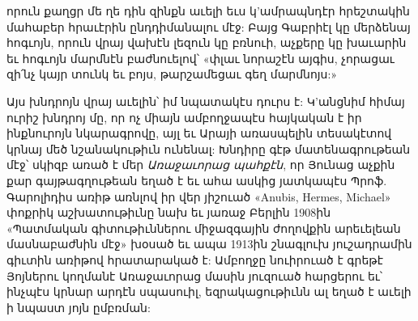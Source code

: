 \documentclass{article}
\begin{document}
{որուն քաղցր մե ղե դին զինքն աւելի եւս կ'ամրապնդէր հրեշտակին մահաբեր հրաւէրին ընդդիմանալու մէջ: Բայց Գաբրիէլ կը մերձենայ հոգւոյն, որուն վրայ վախէն լեզուն կը բռնուի, աչքերը կը խաւարին եւ հոգւոյն մարմնէն բաժնուելով՝ «փլաւ նորաշէն այգիս, չորացաւ զի՛նչ կայր տունկ եւ բոյս, թարշամեցաւ գեղ մարմնոյս:»

Այս խնդրոյն վրայ աւելին՝ իմ նպատակէս դուրս է: Կ'անցնիմ հիմայ ուրիշ խնդրոյ մը, որ ոչ միայն ամբողջապէս հայկական է իր ինքնուրոյն նկարագրովը, այլ եւ Արայի առասպելին տեսակէտով կրնայ մեծ նշանակութիւն ունենալ: Խնդիրը գէթ մատենագրութեան մէջ՝ սկիզբ առած է մեր \emph{Առաջաւորաց պահքէն}, որ Յունաց աչքին քար գայթագղութեան եղած է եւ ահա ասկից յատկապէս Պրոֆ. Գարոլիդիս առիթ առնլով իր վեր յիշուած «Anubis, Hermes, Michael» փոքրիկ աշխատութիւնը նախ եւ յառաջ Բերլին 1908ին «Պատմական գիտութիւններու միջազգային ժողովքին արեւելեան մասնաբաժնին մէջ» խօսած եւ ապա 1913ին շնագլուխ յուշադրամին գիւտին առիթով հրատարակած է: Ամբողջը նուիրուած է գրեթէ Յոյներու կողմանէ Առաջաւորաց մասին յուզուած հարցերու եւ՝ ինչպէս կրնար արդէն սպասուիլ, եզրակացութիւնն ալ եղած է աւելի ի նպաստ յոյն ըմբռման:

}
\end{document}
